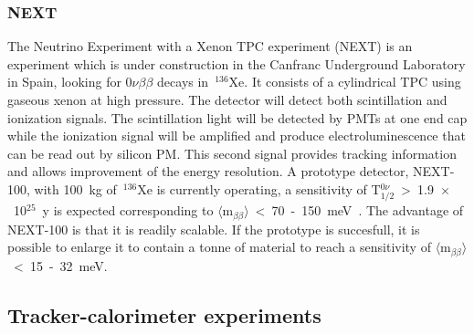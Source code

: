 \documentclass[main.tex]{subfiles}
\begin{document}


\FloatBarrier


\subsubsection{NEXT}


\NI The Neutrino Experiment with a Xenon TPC experiment (NEXT) is an experiment which is under construction in the Canfranc Underground Laboratory in Spain, looking for 0$\nu\beta\beta$ decays in~$^{\text{136}}$Xe. It consists of a cylindrical TPC using gaseous xenon at high pressure. The detector will detect both scintillation and ionization signals. The scintillation light will be detected by PMTs at one end cap while the ionization signal will be amplified and produce electroluminescence that can be read out by silicon PM. This second signal provides tracking information and allows improvement of the energy resolution. A prototype detector, NEXT-100, with 100~kg of~$^{\text{136}}$Xe is currently operating, a sensitivity of T$_{\text{1/2}}^{0\nu}$~>~1.9~$\times$~10$^{\text{25}}$~y is expected corresponding to $\langle \text{m}_{\beta\beta} \rangle$~<~70~-~150~meV~\cite{NEXT}. The advantage of NEXT-100 is that it is readily scalable. If the prototype is succesfull, it is possible to enlarge it to contain a tonne of material to reach a sensitivity of $\langle \text{m}_{\beta\beta} \rangle$~<~15~-~32~meV.



\subsection{Tracker-calorimeter experiments}
\end{document}
